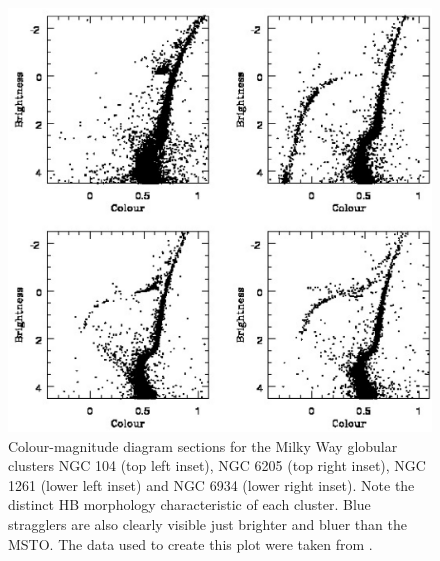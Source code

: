 \begin{figure} [!h]
  \begin{center}
 \includegraphics[scale=0.5]{Chapter-1/thesis_fig3.ps}
    \caption[CMD sections for the Milky Way globular clusters NGC
    6205, NGC 104, NGC 1261 and NGC 6934]{Colour-magnitude diagram sections
      for the Milky Way globular clusters NGC 104 (top left inset),
      NGC 6205 (top right inset), NGC 1261 (lower left inset) and NGC 6934
      (lower right inset).  Note the distinct HB morphology 
      characteristic of each cluster.  Blue stragglers are also
      clearly visible just brighter and bluer than the MSTO.  The data
      used to create this plot were taken from 
      \citet{sarajedini07}.  %
      \label{fig:HB_CMDs}}
    \end{center}
\end{figure}

